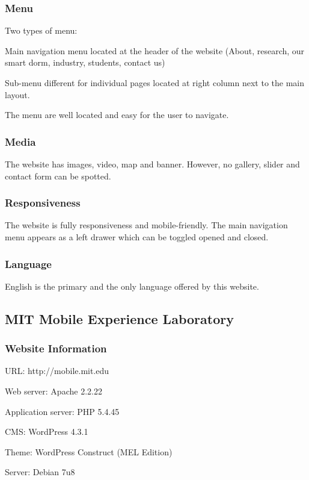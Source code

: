 \subsubsection*{Menu}
Two types of menu:
\begin{itemize*}
\item Main navigation menu located at the header of the website (About, research, our smart dorm, industry, students, contact us)
\item Sub-menu different for individual pages located at right column next to the main layout.
\end{itemize*}

The menu are well located and easy for the user to navigate.

\subsubsection*{Media}
The website has images, video, map and banner. However, no gallery, slider and contact form can be spotted.

\subsubsection*{Responsiveness}
The website is fully responsiveness and mobile-friendly. The main navigation menu appears as a left drawer which can be toggled opened and closed.

\subsubsection*{Language}
English is the primary and the only language offered by this website.

\subsection{MIT Mobile Experience Laboratory}
\subsubsection*{Website Information}
\begin{itemize*}
\item URL: http://mobile.mit.edu
\item Web server: Apache 2.2.22
\item Application server: PHP 5.4.45
\item CMS: WordPress 4.3.1
\item Theme: WordPress Construct (MEL Edition)
\item Server: Debian 7u8
\end{itemize*}

